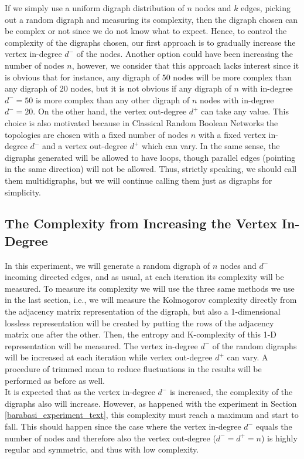 If we simply use a uniform digraph distribution of $n$ nodes and $k$ edges, picking out a random digraph and measuring its complexity, then the digraph chosen can be complex or not since we do not know what to expect. Hence, to control the complexity of the digraphs chosen, our first approach is to gradually increase the vertex in-degree $ d^{-}$ of the nodes. Another option could have been increasing the number of nodes $n$, however, we consider that this approach lacks interest since it is obvious that for instance, any digraph of $50$ nodes will be more complex than any digraph of $20$ nodes, but it is not obvious if any digraph of $n$ with in-degree $ d^{-}=50$ is more complex than any other digraph of $n$ nodes with in-degree $ d^{-}=20$. On the other hand, the vertex out-degree $ d^{+}$ can take any value. This choice is also motivated because in Classical Random Boolean Networks the topologies are chosen with a fixed number of nodes $n$ with a fixed vertex in-degree $ d^{-}$ and a vertex out-degree $ d^{+}$ which can vary. In the same sense, the digraphs generated will be allowed to have loops, though parallel edges (pointing in the same direction) will not be allowed. Thus, strictly speaking, we should call them multidigraphs, but we will continue calling them just as digraphs for simplicity.

\subsection{The Complexity from Increasing the Vertex In-Degree}
\label{comp_incr_vert_in_section}
In this experiment, we will generate a random digraph of $n$ nodes and $d^{-}$ incoming directed edges, and as usual, at each iteration its complexity will be measured. To measure its complexity we will use the three same methods we use in the last section, i.e., we will measure the Kolmogorov complexity directly from the adjacency matrix representation of the digraph, but also a 1-dimensional lossless representation will be created by putting the rows of the adjacency matrix one after the other. Then, the entropy and K-complexity of this 1-D representation will be measured. The vertex in-degree $ d^{-}$ of the random digraphs will be increased at each iteration while vertex out-degree $ d^{+}$ can vary. A procedure of trimmed mean to reduce fluctuations in the results will be performed as before as well.\\

It is expected that as the vertex in-degree $ d^{-}$ is increased, the complexity of the digraphs also will increase. However, as happened with the experiment in Section \ref{barabasi_experiment_text}, this complexity must reach a maximum and start to fall. This should happen since the case where the vertex in-degree $ d^{-}$ equals the number of nodes and therefore also the vertex out-degree ($ d^{-}=d^{+}=n$) is highly regular and symmetric, and thus with low complexity.\\

